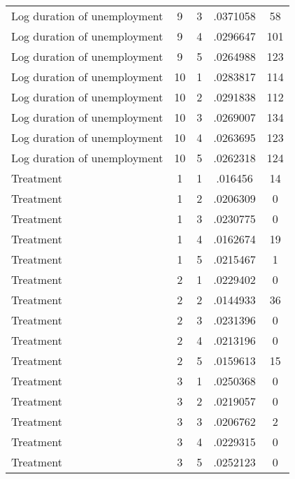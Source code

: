 \begin{tabular}{l*{4}{c}}
Log duration of unemployment&           9&           3&    .0371058&          58\\
Log duration of unemployment&           9&           4&    .0296647&         101\\
Log duration of unemployment&           9&           5&    .0264988&         123\\
Log duration of unemployment&          10&           1&    .0283817&         114\\
Log duration of unemployment&          10&           2&    .0291838&         112\\
Log duration of unemployment&          10&           3&    .0269007&         134\\
Log duration of unemployment&          10&           4&    .0263695&         123\\
Log duration of unemployment&          10&           5&    .0262318&         124\\
Treatment           &           1&           1&     .016456&          14\\
Treatment           &           1&           2&    .0206309&           0\\
Treatment           &           1&           3&    .0230775&           0\\
Treatment           &           1&           4&    .0162674&          19\\
Treatment           &           1&           5&    .0215467&           1\\
Treatment           &           2&           1&    .0229402&           0\\
Treatment           &           2&           2&    .0144933&          36\\
Treatment           &           2&           3&    .0231396&           0\\
Treatment           &           2&           4&    .0213196&           0\\
Treatment           &           2&           5&    .0159613&          15\\
Treatment           &           3&           1&    .0250368&           0\\
Treatment           &           3&           2&    .0219057&           0\\
Treatment           &           3&           3&    .0206762&           2\\
Treatment           &           3&           4&    .0229315&           0\\
Treatment           &           3&           5&    .0252123&           0\\

\end{tabular}
